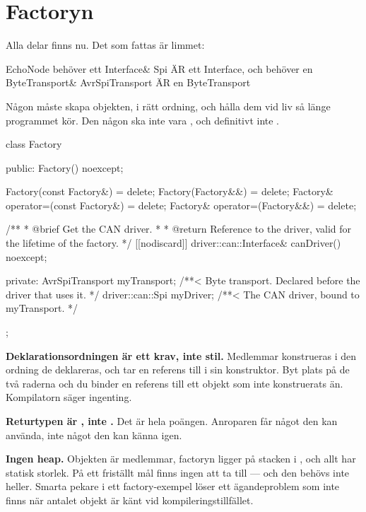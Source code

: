\section{Factoryn}
\label{sec:factory}

Alla delar finns nu. Det som fattas är limmet:

\begin{console}
EchoNode         behöver ett  Interface&
Spi              ÄR ett       Interface,  och behöver en ByteTransport&
AvrSpiTransport  ÄR en        ByteTransport
\end{console}

Någon måste skapa objekten, i rätt ordning, och hålla dem vid liv så länge programmet kör. Den
någon ska inte vara , och definitivt inte .

\begin{cppcode}
class Factory
{
public:
    Factory() noexcept;

    Factory(const Factory&)            = delete;
    Factory(Factory&&)                 = delete;
    Factory& operator=(const Factory&) = delete;
    Factory& operator=(Factory&&)      = delete;

    /**
     * @brief Get the CAN driver.
     *
     * @return Reference to the driver, valid for the lifetime of the factory.
     */
    [[nodiscard]] driver::can::Interface& canDriver() noexcept;

private:
    AvrSpiTransport myTransport; /**< Byte transport. Declared before the driver that uses it. */
    driver::can::Spi myDriver;   /**< The CAN driver, bound to myTransport. */
};
\end{cppcode}

\textbf{Deklarationsordningen är ett krav, inte stil.} Medlemmar konstrueras i den ordning de
deklareras, och  tar en referens till  i sin konstruktor. Byt
plats på de två raderna och du binder en referens till ett objekt som inte konstruerats än.
Kompilatorn säger ingenting.

\textbf{Returtypen är , inte .} Det är hela poängen. Anroparen får
något den kan använda, inte något den kan känna igen.

\textbf{Ingen heap.} Objekten är medlemmar, factoryn ligger på stacken i , och allt har
statisk storlek. På ett friställt mål finns ingen  att ta till --- och den
behövs inte heller. Smarta pekare i ett factory-exempel löser ett ägandeproblem som inte finns när
antalet objekt är känt vid kompileringstillfället.

